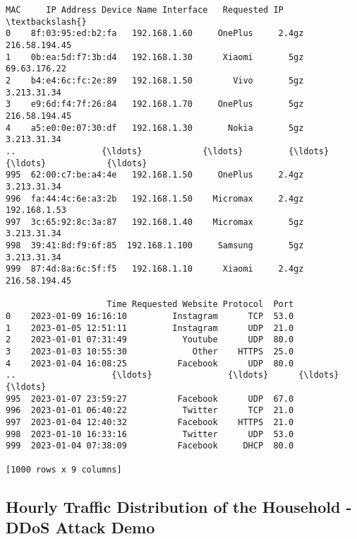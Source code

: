 \documentclass[11pt]{article}
\makeatletter
\newcommand{\boxspacing}{\kern\kvtcb@left@rule\kern\kvtcb@boxsep}
\newcommand{\prompt}[4]{
        {\ttfamily\llap{{\color{#2}[#3]:\hspace{3pt}#4}}\vspace{-\baselineskip}}
    }
\makeatother
\begin{document}
            \begin{tcolorbox}[breakable, size=fbox, boxrule=.5pt, pad at break*=1mm, opacityfill=0]
\prompt{Out}{outcolor}{37}{\boxspacing}
\begin{Verbatim}[commandchars=\\\{\}]
                   MAC     IP Address Device Name Interface   Requested IP  \textbackslash{}
0    8f:03:95:ed:b2:fa   192.168.1.60     OnePlus     2.4gz  216.58.194.45
1    0b:ea:5d:f7:3b:d4   192.168.1.30      Xiaomi       5gz   69.63.176.22
2    b4:e4:6c:fc:2e:89   192.168.1.50        Vivo       5gz    3.213.31.34
3    e9:6d:f4:7f:26:84   192.168.1.70     OnePlus       5gz  216.58.194.45
4    a5:e0:0e:07:30:df   192.168.1.30       Nokia       5gz    3.213.31.34
..                 {\ldots}            {\ldots}         {\ldots}       {\ldots}            {\ldots}
995  62:00:c7:be:a4:4e   192.168.1.50     OnePlus     2.4gz    3.213.31.34
996  fa:44:4c:6e:a3:2b   192.168.1.50    Micromax     2.4gz   192.168.1.53
997  3c:65:92:8c:3a:87   192.168.1.40    Micromax       5gz    3.213.31.34
998  39:41:8d:f9:6f:85  192.168.1.100     Samsung       5gz    3.213.31.34
999  87:4d:8a:6c:5f:f5   192.168.1.10      Xiaomi     2.4gz  216.58.194.45

                    Time Requested Website Protocol  Port
0    2023-01-09 16:16:10         Instagram      TCP  53.0
1    2023-01-05 12:51:11         Instagram      UDP  21.0
2    2023-01-01 07:31:49           Youtube      UDP  80.0
3    2023-01-03 10:55:30             Other    HTTPS  25.0
4    2023-01-04 16:08:25          Facebook      UDP  80.0
..                   {\ldots}               {\ldots}      {\ldots}   {\ldots}
995  2023-01-07 23:59:27          Facebook      UDP  67.0
996  2023-01-01 06:40:22           Twitter      TCP  21.0
997  2023-01-04 12:40:32          Facebook    HTTPS  21.0
998  2023-01-10 16:33:16           Twitter      UDP  53.0
999  2023-01-04 07:38:09          Facebook     DHCP  80.0

[1000 rows x 9 columns]
\end{Verbatim}
\end{tcolorbox}
        
    \hypertarget{hourly-traffic-distribution-of-the-household---ddos-attack-demo}{%
\subsection{Hourly Traffic Distribution of the Household - DDoS Attack
Demo}\label{hourly-traffic-distribution-of-the-household---ddos-attack-demo}}
\end{document}
